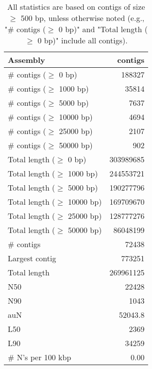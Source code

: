 \documentclass[12pt,a4paper]{article}
\begin{document}
\begin{table}[ht]
\begin{center}
\caption{All statistics are based on contigs of size $\geq$ 500 bp, unless otherwise noted (e.g., "\# contigs ($\geq$ 0 bp)" and "Total length ($\geq$ 0 bp)" include all contigs).}
\begin{tabular}{|l*{1}{|r}|}
\hline
Assembly & contigs \\ \hline
\# contigs ($\geq$ 0 bp) & 188327 \\ \hline
\# contigs ($\geq$ 1000 bp) & 35814 \\ \hline
\# contigs ($\geq$ 5000 bp) & 7637 \\ \hline
\# contigs ($\geq$ 10000 bp) & 4694 \\ \hline
\# contigs ($\geq$ 25000 bp) & 2107 \\ \hline
\# contigs ($\geq$ 50000 bp) & 902 \\ \hline
Total length ($\geq$ 0 bp) & 303989685 \\ \hline
Total length ($\geq$ 1000 bp) & 244553721 \\ \hline
Total length ($\geq$ 5000 bp) & 190277796 \\ \hline
Total length ($\geq$ 10000 bp) & 169709670 \\ \hline
Total length ($\geq$ 25000 bp) & 128777276 \\ \hline
Total length ($\geq$ 50000 bp) & 86048199 \\ \hline
\# contigs & 72438 \\ \hline
Largest contig & 773251 \\ \hline
Total length & 269961125 \\ \hline
N50 & 22428 \\ \hline
N90 & 1043 \\ \hline
auN & 52043.8 \\ \hline
L50 & 2369 \\ \hline
L90 & 34259 \\ \hline
\# N's per 100 kbp & 0.00 \\ \hline
\end{tabular}
\end{center}
\end{table}
\end{document}
